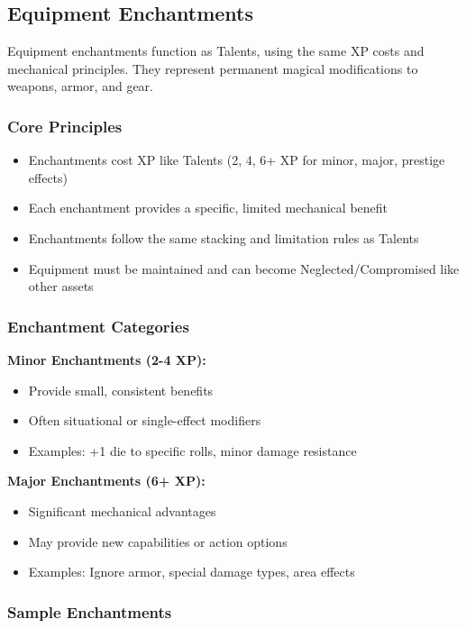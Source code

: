 \subsection{Equipment Enchantments}

Equipment enchantments function as Talents, using the same XP costs and mechanical principles. They represent permanent magical modifications to weapons, armor, and gear.

\subsubsection{Core Principles}

\begin{itemize}
\item Enchantments cost XP like Talents (2, 4, 6+ XP for minor, major, prestige effects)
\item Each enchantment provides a specific, limited mechanical benefit
\item Enchantments follow the same stacking and limitation rules as Talents
\item Equipment must be maintained and can become Neglected/Compromised like other assets
\end{itemize}

\subsubsection{Enchantment Categories}

\textbf{Minor Enchantments (2-4 XP):}
\begin{itemize}
\item Provide small, consistent benefits
\item Often situational or single-effect modifiers
\item Examples: +1 die to specific rolls, minor damage resistance
\end{itemize}

\textbf{Major Enchantments (6+ XP):}
\begin{itemize}
\item Significant mechanical advantages
\item May provide new capabilities or action options
\item Examples: Ignore armor, special damage types, area effects
\end{itemize}

\subsubsection{Sample Enchantments}


